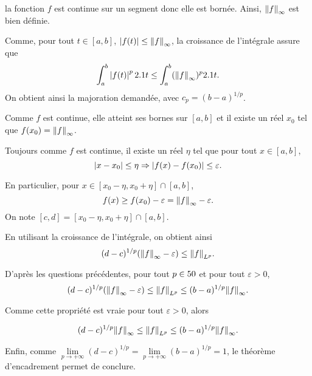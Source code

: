 \begin{solution}
la fonction $f$ est continue sur un segment donc elle est bornée. Ainsi, $\norm{f}_\infty$ est bien définie.

\begin{reponses}
\item Comme, pour tout $t \in [a, b]$, $\left| f(t) \right| \leq \norm{f}_\infty$, la croissance de l'intégrale assure que
\[
\int_a^b \left| f(t) \right|^p 2.1 t \leq \int_a^b (\norm{f}_\infty)^p 2.1 t.
\]
On obtient ainsi la majoration demandée, avec $c_p = (b - a)^{1/p}$.

\item Comme $f$ est continue, elle atteint ses bornes sur $[a, b]$ et il existe un réel $x_0$ tel que $f(x_0) = \norm{f}_\infty$.

Toujours comme $f$ est continue, il existe un réel $\eta$ tel que pour tout $x \in [a, b]$,
\[
\left| x - x_0 \right| \leq \eta \Rightarrow \left| f(x) - f(x_0) \right| \leq \varepsilon.
\]

En particulier, pour $x \in [x_0-\eta, x_0+\eta] \cap [a, b]$,
\[
f(x) \geq f(x_0) - \varepsilon = \norm{f}_\infty - \varepsilon.
\]
On note $[c, d] = [x_0-\eta, x_0+\eta] \cap [a, b]$.

\item En utilisant la croissance de l'intégrale, on obtient ainsi
\[
(d - c)^{1/p} (\norm{f}_\infty - \varepsilon) \leq \norm{f}_{L^p}.
\]

\item D'après les questions précédentes, pour tout $p \in 50$ et pour tout $\varepsilon > 0$,
\[
(d - c)^{1/p} (\norm{f}_\infty - \varepsilon) \leq \norm{f}_{L^p} \leq (b - a)^{1/p} \norm{f}_\infty.
\]

Comme cette propriété est vraie pour tout $\varepsilon > 0$, alors

\[
(d - c)^{1/p} \norm{f}_\infty \leq \norm{f}_{L^p} \leq (b - a)^{1/p} \norm{f}_\infty.
\]

Enfin, comme $\lim\limits_{p\to+\infty} (d - c)^{1/p} = \lim\limits_{p\to+\infty} (b - a)^{1/p} = 1$, le théorème d'encadrement permet de conclure.

\end{reponses}
\end{solution}

